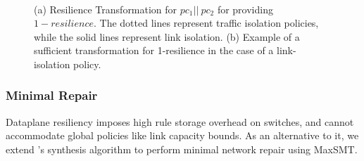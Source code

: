 \begin{figure}
	\centering
	~~~~~
	\caption{\label{fig:restransform}
		(a) Resilience Transformation for $pc_1 || \ pc_2$ for providing $1-resilience$. 
		The dotted lines represent traffic isolation policies, 
		while the solid lines represent link isolation. (b) Example of a sufficient transformation
		for 1-resilience in the case of a link-isolation policy.}
\end{figure}


\subsubsection{Minimal Repair} \label{sec:repair}

Dataplane resiliency imposes high rule storage overhead on switches,
and cannot accommodate global policies like link capacity bounds. 
As an alternative to it, we
extend \name's synthesis algorithm to perform minimal network
repair using MaxSMT.

